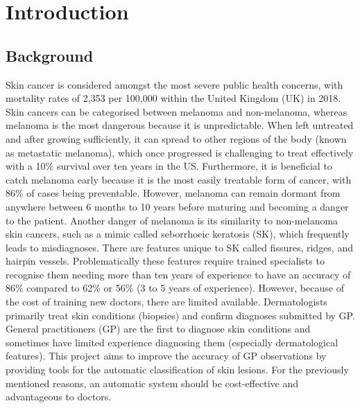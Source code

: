 

\cleardoublepage

\chapter{Introduction}

\section{Background}
Skin cancer is considered amongst the most severe public health concerns, with mortality rates of 2,353 per 100,000 within the United Kingdom (UK) in 2018\cite{UK2019}. Skin cancers can be categorised between melanoma and non-melanoma, whereas melanoma is the most dangerous because it is unpredictable. When left untreated and after growing sufficiently, it can spread to other regions of the body (known as metastatic melanoma), which once progressed is challenging to treat effectively with a 10\% survival over ten years in the US\cite{bhatia2009}. Furthermore, it is beneficial to catch melanoma early because it is the most easily treatable form of cancer, with 86\% of cases being preventable\cite{UK2019}. However, melanoma can remain dormant from anywhere between 6 months to 10 years before maturing and becoming a danger to the patient\cite{UK2019}. Another danger of melanoma is its similarity to non-melanoma skin cancers, such as a mimic called seborrhoeic keratosis (SK), which frequently leads to misdiagnoses\cite{Izikson2002}. There are features unique to SK called fissures, ridges, and hairpin vessels\cite{Minagawa2017}. Problematically these features require trained specialists to recognise them needing more than ten years of experience to have an accuracy of 86\% compared to 62\% or 56\% (3 to 5 years of experience)\cite{Morton1998}. However, because of the cost of training new doctors, there are limited available. Dermatologists primarily treat skin conditions (biopsies) and confirm diagnoses submitted by GP. General practitioners (GP) are the first to diagnose skin conditions and sometimes have limited experience diagnosing them (especially dermatological features). This project aims to improve the accuracy of GP observations by providing tools for the automatic classification of skin lesions. For the previously mentioned reasons, an automatic system should be cost-effective and advantageous to doctors.

